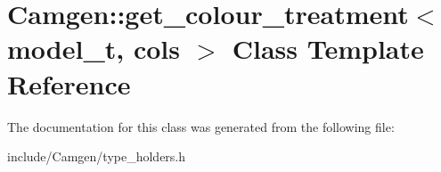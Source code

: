 \hypertarget{a00240}{\section{Camgen\-:\-:get\-\_\-colour\-\_\-treatment$<$ model\-\_\-t, cols $>$ Class Template Reference}
\label{a00240}
}


The documentation for this class was generated from the following file\-:\begin{DoxyCompactItemize}
\item 
include/\-Camgen/type\-\_\-holders.\-h\end{DoxyCompactItemize}
